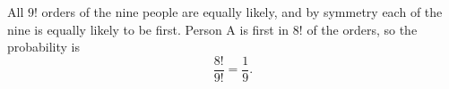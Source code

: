 All $9!$ orders of the nine people are equally likely, and by symmetry each of the nine is equally likely to be first. Person A is first in $8!$ of the orders, so the probability is
\[\dfrac{8!}{9!}=\boxed{\dfrac19}.\]
